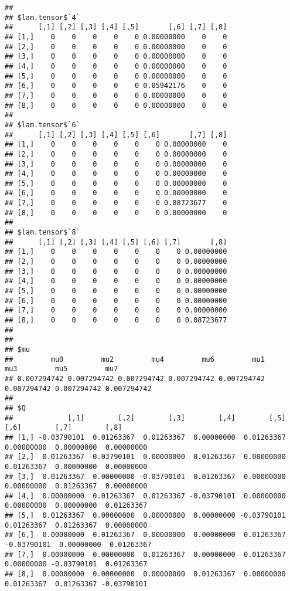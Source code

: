 \documentclass[
]{article}
\begin{document}
\begin{verbatim}
## 
## $lam.tensor$`4`
##      [,1] [,2] [,3] [,4] [,5]       [,6] [,7] [,8]
## [1,]    0    0    0    0    0 0.00000000    0    0
## [2,]    0    0    0    0    0 0.00000000    0    0
## [3,]    0    0    0    0    0 0.00000000    0    0
## [4,]    0    0    0    0    0 0.00000000    0    0
## [5,]    0    0    0    0    0 0.00000000    0    0
## [6,]    0    0    0    0    0 0.05942176    0    0
## [7,]    0    0    0    0    0 0.00000000    0    0
## [8,]    0    0    0    0    0 0.00000000    0    0
## 
## $lam.tensor$`6`
##      [,1] [,2] [,3] [,4] [,5] [,6]       [,7] [,8]
## [1,]    0    0    0    0    0    0 0.00000000    0
## [2,]    0    0    0    0    0    0 0.00000000    0
## [3,]    0    0    0    0    0    0 0.00000000    0
## [4,]    0    0    0    0    0    0 0.00000000    0
## [5,]    0    0    0    0    0    0 0.00000000    0
## [6,]    0    0    0    0    0    0 0.00000000    0
## [7,]    0    0    0    0    0    0 0.08723677    0
## [8,]    0    0    0    0    0    0 0.00000000    0
## 
## $lam.tensor$`8`
##      [,1] [,2] [,3] [,4] [,5] [,6] [,7]       [,8]
## [1,]    0    0    0    0    0    0    0 0.00000000
## [2,]    0    0    0    0    0    0    0 0.00000000
## [3,]    0    0    0    0    0    0    0 0.00000000
## [4,]    0    0    0    0    0    0    0 0.00000000
## [5,]    0    0    0    0    0    0    0 0.00000000
## [6,]    0    0    0    0    0    0    0 0.00000000
## [7,]    0    0    0    0    0    0    0 0.00000000
## [8,]    0    0    0    0    0    0    0 0.08723677
## 
## 
## $mu
##         mu0         mu2         mu4         mu6         mu1         mu3         mu5         mu7 
## 0.007294742 0.007294742 0.007294742 0.007294742 0.007294742 0.007294742 0.007294742 0.007294742 
## 
## $Q
##             [,1]        [,2]        [,3]        [,4]        [,5]        [,6]        [,7]        [,8]
## [1,] -0.03790101  0.01263367  0.01263367  0.00000000  0.01263367  0.00000000  0.00000000  0.00000000
## [2,]  0.01263367 -0.03790101  0.00000000  0.01263367  0.00000000  0.01263367  0.00000000  0.00000000
## [3,]  0.01263367  0.00000000 -0.03790101  0.01263367  0.00000000  0.00000000  0.01263367  0.00000000
## [4,]  0.00000000  0.01263367  0.01263367 -0.03790101  0.00000000  0.00000000  0.00000000  0.01263367
## [5,]  0.01263367  0.00000000  0.00000000  0.00000000 -0.03790101  0.01263367  0.01263367  0.00000000
## [6,]  0.00000000  0.01263367  0.00000000  0.00000000  0.01263367 -0.03790101  0.00000000  0.01263367
## [7,]  0.00000000  0.00000000  0.01263367  0.00000000  0.01263367  0.00000000 -0.03790101  0.01263367
## [8,]  0.00000000  0.00000000  0.00000000  0.01263367  0.00000000  0.01263367  0.01263367 -0.03790101
\end{verbatim}
\end{document}
